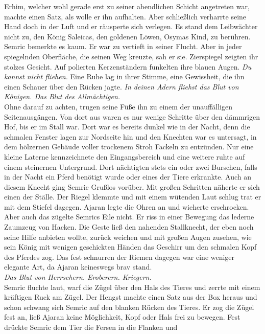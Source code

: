 Erhim, welcher wohl gerade erst zu seiner abendlichen Schicht angetreten war, 
machte einen Satz, 
als wolle er ihn aufhalten. Aber schließlich verharrte seine Hand doch in der 
Luft und er räusperte 
sich verlegen. Es stand dem Leibwächter nicht zu, den König Saleicas, den 
goldenen Löwen, Osymas 
Kind, zu berühren. Semric bemerkte es kaum. Er war zu vertieft in seiner 
Flucht. Aber in jeder 
spiegelnden Oberfläche, die seinen Weg kreuzte, sah er sie. Zierspiegel zeigten 
ihr stolzes 
Gesicht. Auf polierten Kerzenständern funkelten ihre blauen Augen. \textit{Du 
kannst nicht fliehen.} 
Eine Ruhe lag in ihrer Stimme, eine Gewissheit, die ihn einen Schauer über den 
Rücken jagte. 
\textit{In deinen Adern fliehst das Blut von Königen. Das Blut des 
Allmächtigen.}\\
Ohne darauf zu achten, trugen seine Füße ihn zu einem der unauffälligen 
Seitenausgängen. Von dort 
aus waren es nur wenige Schritte über den dämmrigen Hof, bis er im Stall war. 
Dort war es bereits 
dunkel wie in der Nacht, denn die schmalen Fenster lagen zur Nordseite hin und 
den Knechten war es 
untersagt, in dem hölzernen Gebäude voller trockenem Stroh Fackeln zu 
entzünden. Nur eine kleine 
Laterne kennzeichnete den Eingangsbereich und eine weitere ruhte auf einem 
steinernen Untergrund. 
Dort nächtigten stets ein oder zwei Burschen, falls in der Nacht ein Pferd 
benötigt wurde oder 
eines der Tiere erkrankte. Auch an diesem Knecht ging Semric Grußlos vorüber. 
Mit großen Schritten 
näherte er sich einen der Ställe. Der Riegel klemmte und mit einem wütenden 
Laut schlug trat er mit 
dem Stiefel dagegen. Ajaran legte die Ohren an und wieherte erschrocken. Aber 
auch das zügelte 
Semrics Eile nicht. Er riss in einer Bewegung das lederne Zaumzeug von Hacken. 
Die Geste ließ den 
nahenden Stallknecht, der eben noch seine Hilfe anbieten wollte, zurück weichen 
und mit großen 
Augen zusehen, wie sein König mit wenigen geschickten Händen das Geschirr um 
den schmalen Kopf des 
Pferdes zog. Das fest schnurren der Riemen dagegen war eine weniger elegante 
Art, da Ajaran 
keineswegs brav stand. \\
\textit{Das Blut von Herrschern. Eroberern. Kriegern.}\\
Semric fluchte laut, warf die Zügel über den Hals des Tieres und zerrte mit 
einem kräftigen Ruck am 
Zügel. Der Hengst machte einen Satz aus der Box heraus und schon schwang sich 
Semric auf den 
blanken Rücken des Tieres. Er zog die Zügel fest an, ließ Ajaran keine 
Möglichkeit, Kopf oder Hals  
frei zu bewegen. Fest drückte Semric dem Tier die Fersen in die Flanken und 
